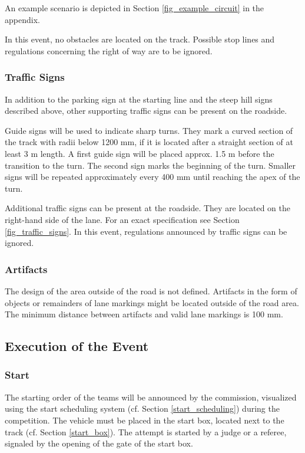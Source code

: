 \documentclass[a4paper]{report}
\begin{document}
An example scenario is depicted in Section \ref{fig_example_circuit} in the appendix. 

In this event, no obstacles are located on the track. Possible stop lines and regulations concerning the right of way are to be ignored. 

\subsubsection{Traffic Signs}
\label{traffic_signs}

In addition to the parking sign at the starting line and the steep hill signs described above, other supporting traffic signs can be present on the roadside. 

Guide signs will be used to indicate sharp turns. They mark a curved section of the track with radii below 1200 mm, if it is located after a straight section of at least 3 m length. A first guide sign will be placed approx. 1.5 m before the transition to the turn. The second sign marks the beginning of the turn. Smaller signs will be repeated approximately every 400 mm until reaching the apex of the turn. 

Additional traffic signs can be present at the roadside. They are located on the right-hand side of the lane. For an exact specification see Section \ref{fig_traffic_signs}. In this event, regulations announced by traffic signs can be ignored. 

\subsubsection{Artifacts}
\label{artifacts}

The design of the area outside of the road is not defined. Artifacts in the form of objects or remainders of lane markings might be located outside of the road area. The minimum distance between artifacts and valid lane markings is 100 mm. 

\subsection{Execution of the Event}

\subsubsection{Start} 

The starting order of the teams will be announced by the commission, visualized using the start scheduling system (cf. Section \ref{start_scheduling}) during the competition. The vehicle must be placed in the start box, located next to the track (cf. Section \ref{start_box}). The attempt is started by a judge or a referee, signaled by the opening of the gate of the start box.
\end{document}
